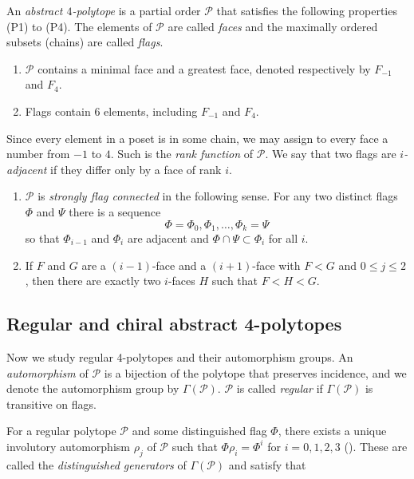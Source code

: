 \documentclass{amsart}
\begin{document}
An \textit{abstract $4$-polytope} is a partial order $\mathcal{P}$ that
satisfies the following properties (P1) to (P4). The elements of $\mathcal{P}$
are called \textit{faces} and the maximally ordered subsets (chains) are called
\textit{flags}.

\begin{enumerate}
\item[(P1)]\label{P1} $\mathcal{P}$ contains a minimal face and a greatest face, 
denoted respectively by $F_{-1}$ and $F_4$.
\item[(P2)]\label{P2} Flags contain $6$ elements, including $F_{-1}$ and $F_4$.
\end{enumerate}

Since every element in a poset is in some chain, we may assign to every face a
number from $-1$ to $4$. Such is the \textit{rank function} of $\mathcal{P}$. We
say that two flags are \textit{$i$-adjacent} if they differ only by a face of
rank $i$.

\begin{enumerate}
\item[(P3)]\label{P3} $\mathcal{P}$ is \textit{strongly flag connected} in the following 
sense. For any two distinct flags $\Phi$ and $\Psi$ there is a sequence
$$\Phi=\Phi_0,\Phi_1,\ldots,\Phi_k=\Psi$$
so that $\Phi_{i-1}$ and $\Phi_i$ are adjacent and $\Phi\cap\Psi\subset\Phi_i$ for all $i$.
\item[(P4)]\label{P4} If $F$ and $G$ are a $(i-1)$-face and a $(i+1)$-face 
with $F<G$ and $0\leq j\leq2$, then there are exactly two $i$-faces $H$ such that $F<H<G$.
\end{enumerate}
	
\subsection{Regular and chiral abstract 4-polytopes}
\label{subsection-regular-and-chiral-abstract-4-polyopes}

Now we study regular 4-polytopes and their automorphism groups. An
\textit{automorphism} of $\mathcal{P}$ is a bijection of the polytope that
preserves incidence, and we denote the automorphism group by
$\Gamma(\mathcal{P})$. $\mathcal{P}$ is called \textit{regular} if
$\Gamma(\mathcal{P})$ is transitive on flags.
	
For a regular polytope $\mathcal{P}$ and some distinguished flag $\Phi$, there
exists a unique involutory automorphism $\rho_j$ of $\mathcal{P}$ such that
$\Phi\rho_i=\Phi^i$ for $i=0,1,2,3$ (\cite[Proposition 2B4]{ARP}). These are called
the \textit{distinguished generators} of $\Gamma(\mathcal{P})$ and satisfy that 
\end{document}
